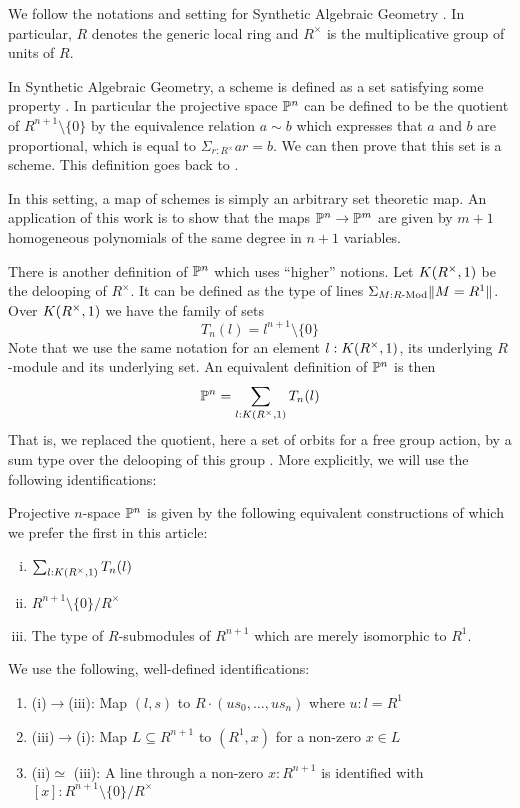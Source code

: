 We follow the notations and setting for Synthetic Algebraic Geometry \cite{draft}.
In particular, $R$ denotes the generic local ring and $R^\times$ is the multiplicative group of units of $R$.

In Synthetic Algebraic Geometry, a scheme is defined as a set satisfying some property \cite{draft}. In particular
the projective space $\mathbb{P}^n$ can be defined to be the quotient of $R^{n+1}\setminus\{0\}$ by the
equivalence relation $a\sim b$ which expresses that $a$ and $b$ are proportional, %
which is equal to $\Sigma_{r:R^\times}ar = b$. We can then prove \cite{draft}
that this set is a scheme. This definition goes back to \cite{Kock74}.

 In this setting, a map of schemes is simply an arbitrary set theoretic map. An application of this work is to show
 that the maps $\mathbb{P}^n\rightarrow \mathbb{P}^m$ are given by $m+1$ homogeneous polynomials of the same degree in $n+1$ variables.

\medskip


There is another definition of $\mathbb{P}^n$ which uses ``higher'' notions. Let $K(R^{\times},1)$ be the delooping
of $R^\times$. It can be defined as the type of lines $\Sigma_{M:R\text{-}\mathrm{Mod}}\|{M=R^1}\|$. Over $K(R^{\times},1)$ we have the
family of sets
$$T_n(l) = l^{n+1}\setminus\{0\}$$
Note that we use the same notation for an element $l : K(R^{\times},1)$,
its underlying $R$-module and its underlying set.
An equivalent definition of $\mathbb{P}^n$ is then
$$
\mathbb{P}^n = \sum_{l:K(R^{\times},1)}T_n(l)
$$
That is, we replaced the quotient, here a set of orbits for a free group action, by a sum type over the delooping of this group
\cite{Sym}.
More explicitly, we will use the following identifications:
\begin{remark}\label{identification-Pn}
  Projective $n$-space $\mathbb{P}^n$ is given by the following equivalent constructions of which we prefer
  the first in this article:
  \begin{enumerate}[(i)]
  \item $\sum_{l:K(R^{\times},1)}T_n(l)$
  \item $R^{n+1}\setminus\{0\}/R^\times$
  \item The type of $R$-submodules of $R^{n+1}$ which are merely isomorphic to $R^1$.
  \end{enumerate}
  We use the following, well-defined identifications:
  \begin{enumerate}
  \item[] (i)$\to$(iii): Map $(l,s)$ to $R\cdot (u s_0,\dots, u s_n)$ where $u:l=R^1$
  \item[] (iii)$\to $(i): Map $L\subseteq R^{n+1}$ to $(R^1, x)$ for a non-zero $x\in L$
  \item[] (ii)$\simeq$ (iii): A line through a non-zero $x:R^{n+1}$
          is identified with $[x]:R^{n+1}\setminus\{0\}/R^\times$
  \end{enumerate}
\end{remark}

